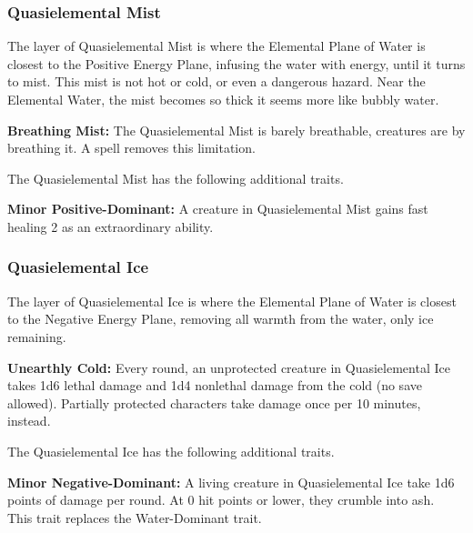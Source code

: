 \subsubsection{Quasielemental Mist}
The layer of Quasielemental Mist is where the Elemental Plane of Water is closest to the Positive Energy Plane, infusing the water with energy, until it turns to mist. This mist is not hot or cold, or even a dangerous hazard. Near the Elemental Water, the mist becomes so thick it seems more like bubbly water.

\textbf{Breathing Mist:} The Quasielemental Mist is barely breathable, creatures are  by breathing it. A  spell removes this limitation.

The Quasielemental Mist has the following additional traits.
\begin{itemize*}
\item \textbf{Minor Positive-Dominant:} A creature in Quasielemental Mist gains fast healing 2 as an extraordinary ability.
\end{itemize*}

\subsubsection{Quasielemental Ice}
The layer of Quasielemental Ice is where the Elemental Plane of Water is closest to the Negative Energy Plane, removing all warmth from the water, only ice remaining.

\textbf{Unearthly Cold:} Every round, an unprotected creature in Quasielemental Ice takes 1d6 lethal damage and 1d4 nonlethal damage from the cold (no save allowed). Partially protected characters take damage once per 10 minutes, instead.

The Quasielemental Ice has the following additional traits.
\begin{itemize*}
\item \textbf{Minor Negative-Dominant:} A living creature in Quasielemental Ice take 1d6 points of damage per round. At 0 hit points or lower, they crumble into ash.\\

This trait replaces the Water-Dominant trait.
\end{itemize*}
